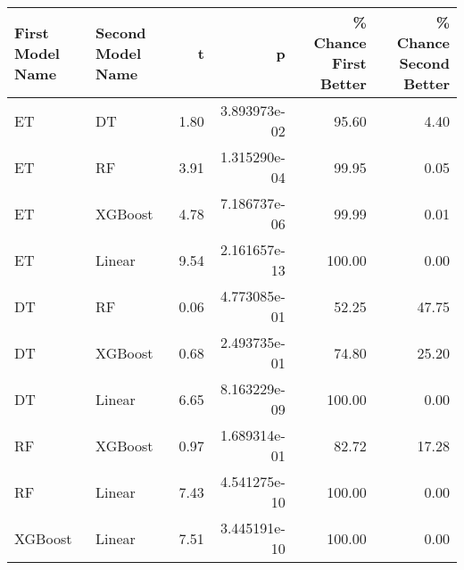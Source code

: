 \begin{tabular}{llrrrr}
\toprule
First Model Name & Second Model Name &    t &            p &  \% Chance First Better &  \% Chance Second Better \\
\midrule
              ET &                DT & 1.80 & 3.893973e-02 &                  95.60 &                    4.40 \\
              ET &                RF & 3.91 & 1.315290e-04 &                  99.95 &                    0.05 \\
              ET &           XGBoost & 4.78 & 7.186737e-06 &                  99.99 &                    0.01 \\
              ET &            Linear & 9.54 & 2.161657e-13 &                 100.00 &                    0.00 \\
              DT &                RF & 0.06 & 4.773085e-01 &                  52.25 &                   47.75 \\
              DT &           XGBoost & 0.68 & 2.493735e-01 &                  74.80 &                   25.20 \\
              DT &            Linear & 6.65 & 8.163229e-09 &                 100.00 &                    0.00 \\
              RF &           XGBoost & 0.97 & 1.689314e-01 &                  82.72 &                   17.28 \\
              RF &            Linear & 7.43 & 4.541275e-10 &                 100.00 &                    0.00 \\
         XGBoost &            Linear & 7.51 & 3.445191e-10 &                 100.00 &                    0.00 \\
\bottomrule
\end{tabular}
